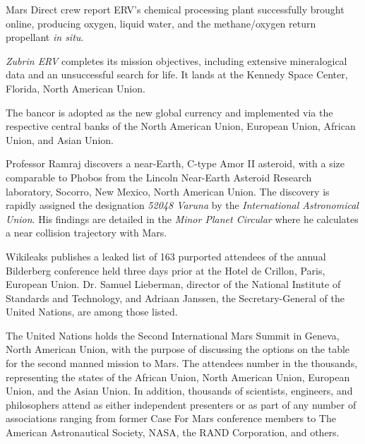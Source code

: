 Mars Direct crew report ERV's chemical processing plant successfully brought online, producing oxygen, liquid water, and the methane/oxygen return propellant {\it in situ}.
\StopTimelineDate

{\it Zubrin ERV} completes its mission objectives, including extensive mineralogical data and an unsuccessful search for life. It lands at the Kennedy Space Center, Florida, North American Union.
\StopTimelineDate

The bancor is adopted as the new global currency and implemented via the respective central banks of the North American Union, European Union, African Union, and Asian Union.
\StopTimelineDate

Professor Ramraj discovers a near-Earth, C-type Amor II asteroid, with a size comparable to Phobos from the Lincoln Near-Earth Asteroid Research laboratory, Socorro, New Mexico, North American Union. The discovery is rapidly assigned the designation {\it 52048 Varuna} by the {\it International Astronomical Union}. His findings are detailed in the {\it Minor Planet Circular} where he calculates a near collision trajectory with Mars.
\StopTimelineDate

Wikileaks publishes a leaked list of 163 purported attendees of the annual Bilderberg conference held three days prior at the Hotel de Crillon, Paris, European Union. Dr. Samuel Lieberman, director of the National Institute of Standards and Technology, and Adriaan Janssen, the Secretary-General of the United Nations, are among those listed.
\StopTimelineDate

The United Nations holds the Second International Mars Summit in Geneva, North American Union, with the purpose of discussing the options on the table for the second manned mission to Mars. The attendees number in the thousands, representing the states of the African Union, North American Union, European Union, and the Asian Union. In addition, thousands of scientists, engineers, and philosophers attend as either independent presenters or as part of any number of associations ranging from former Case For Mars conference members to The American Astronautical Society, NASA, the RAND Corporation, and others.

